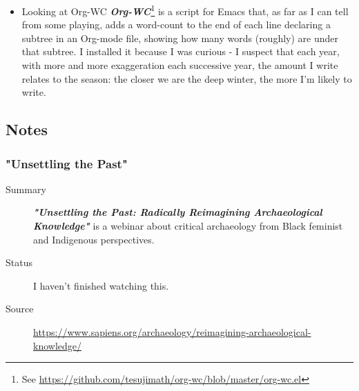 \documentclass[11pt]{article}
\begin{document}
\begin{itemize}
But I'm not sure how exactly that would work. I guess maybe\ldots{} another Github repo? Probably not one for each bulletin but maybe like, \texttt{emsenn/bulletins/2021-10-05.md}?

Anyway, records -> Git -> GitHub -> Ko-fi sounds like a good flow for getting the important writing out there. Right now, there isn't any of that, so I'm worrying before I need to.

If I have capture templates for inputting records and projects for outputting them, then fairly strict formatting is import, which is another concern - I've seen before what happens when I try and automate notes like this too soon: they get useless and cluttered, and I end up simply not participating.
\item Looking at Org-WC
\label{sec:org20b1f62}
\textbf{\emph{Org-WC}}\footnote{See \url{https://github.com/tesujimath/org-wc/blob/master/org-wc.el}} is a script for Emacs that, as far as I can tell from some playing, adds a word-count to the end of each line declaring a subtree in an Org-mode file, showing how many words (roughly) are under that subtree. I installed it because I was curious - I suspect that each year, with more and more exaggeration each successive year, the amount I write relates to the season: the closer we are the deep winter, the more I'm likely to write.
\end{itemize}
\stopcontents[level-4]
\stopcontents[level-3]
\stopcontents[level-2]
\subsection*{Notes}
\label{sec:org6156696}
\startcontents[level-2]
\subsubsection*{"Unsettling the Past"}
\label{sec:org5181064}
\begin{description}
\item[{Summary}] \textbf{\emph{"Unsettling the Past: Radically Reimagining Archaeological Knowledge"}} is a webinar about critical archaeology from Black feminist and Indigenous perspectives.
\item[{Status}] I haven't finished watching this.
\item[{Source}] \url{https://www.sapiens.org/archaeology/reimagining-archaeological-knowledge/}
\end{description}
\end{document}
